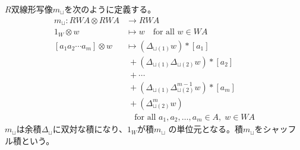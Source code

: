 	\begin{definition}[シャッフル積]\label{def:シャッフル積} %
		$R$双線形写像$m_\sqcup$を次のように定義する。
		\begin{equation*}\begin{split} %
			m_\sqcup: RWA\otimes RWA &\to RWA \\
			1_W\otimes w &\mapsto w \quad\text{for all }w\in WA \\
			[a_1a_2\cdots a_m]\otimes w
			& \mapsto (\Delta_{\sqcup(1)}w)*[a_1] \\
			&\; + (\Delta_{\sqcup(1)}\Delta_{\sqcup(2)}w)*[a_2] \\
			&\; + \cdots \\
			&\; + (\Delta_{\sqcup(1)}\Delta_{\sqcup(2)}^{m-1}w)*[a_{m}] \\
			&\; + (\Delta_{\sqcup(2)}^{m}w) \\
			&\quad\text{for all }a_1,a_2,\dots,a_m\in A,\;w\in WA
		\end{split}\end{equation*} %
		$m_\sqcup$は余積$\Delta_\sqcup$に双対な積になり、$1_W$が積$m_\sqcup$
		の単位元となる。積$m_\sqcup$をシャッフル積という。
	\end{definition} %

